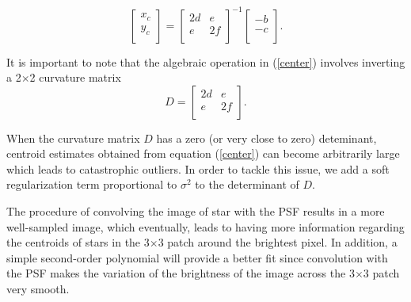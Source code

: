 \documentclass[12pt, preprint]{aastex}
\newcommand{\beq}{\begin{equation}}
\newcommand{\eeq}{\end{equation}}
\begin{document}
\begin{description}
\beq
  \begin{bmatrix}
      x_{c}\\
      y_{c}\\
  \end{bmatrix} = 
  \begin{bmatrix}
      2d & e\\
      e & 2f\\
  \end{bmatrix}^{-1}
  \begin{bmatrix}
      -b\\
      -c\\
  \end{bmatrix}.
\label{center}
\eeq

It is important to note that the algebraic operation in (\ref{center}) involves 
inverting a 2$\times$2 curvature matrix
\beq
  D = 
  \begin{bmatrix}
      2d & e\\
      e & 2f\\
  \end{bmatrix}.
\eeq

When the curvature matrix $D$ has a zero (or very close to zero) deteminant,
centroid estimates obtained from equation (\ref{center}) can become arbitrarily 
large which leads to catastrophic outliers. 
In order to tackle this issue, we add a soft regularization term
proportional to $\sigma^{2}$ to the determinant of $D$.

The procedure of convolving the image of star with the PSF results in a
more well-sampled image, which eventually, leads to having more
information regarding the centroids of stars in the 3$\times$3 patch around the
brightest pixel. In addition, a simple second-order polynomial will provide a better fit 
since convolution with the PSF makes the variation of the brightness of the image
 across the 3$\times$3 patch very smooth.
 

\end{description}
\end{document}
